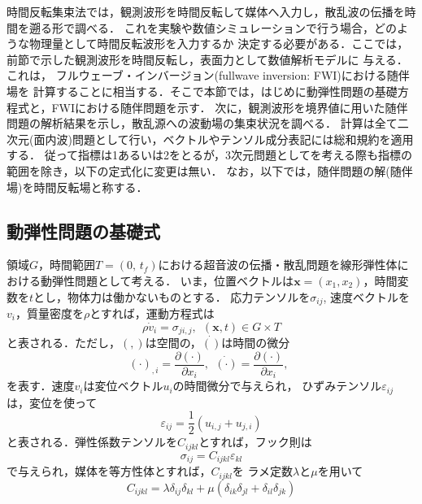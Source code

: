 時間反転集束法では，観測波形を時間反転して媒体へ入力し，散乱波の伝播を時間を遡る形で調べる．
これを実験や数値シミュレーションで行う場合，どのような物理量として時間反転波形を入力するか
決定する必要がある．ここでは，前節で示した観測波形を時間反転し，表面力として数値解析モデルに
与える．これは， フルウェーブ・インバージョン(fullwave inversion: FWI)における随伴場を
計算することに相当する．そこで本節では，はじめに動弾性問題の基礎方程式と，FWIにおける随伴問題を示す．
次に，観測波形を境界値に用いた随伴問題の解析結果を示し，散乱源への波動場の集束状況を調べる．
計算は全て二次元(面内波)問題として行い，ベクトルやテンソル成分表記には総和規約を適用する．
従って指標は1あるいは2をとるが，3次元問題としてを考える際も指標の範囲を除き，以下の定式化に変更は無い．
なお，以下では，随伴問題の解(随伴場)を時間反転場と称する．
\subsection{動弾性問題の基礎式}
領域$G$，時間範囲$T=(0,\, t_f)$における超音波の伝播・散乱問題を線形弾性体における動弾性問題として考える．
いま，位置ベクトルは$\boldsymbol{x}=(x_1,x_2)$，時間変数を$t$とし，物体力は働かないものとする．
応力テンソルを$\sigma_{ij}$, 速度ベクトルを$v_i$，質量密度を$\rho$とすれば，運動方程式は
\begin{equation}
	\rho \dot{v}_i=\sigma_{ji,j}, \ \ (\boldsymbol{x},t)\in G\times T
	\label{eqn:}
\end{equation}
と表される．ただし，$(,)$は空間の，$\dot{()}$は時間の微分
\begin{equation}
	(\cdot)_{,i}=\frac{\partial (\cdot)}{\partial x_i}, \ \ 
	\dot{(\cdot)}=\frac{\partial (\cdot)}{\partial x_i}, \ \ 
	\label{eqn:}
\end{equation}
を表す．速度$v_i$は変位ベクトル$u_i$の時間微分で与えられ，
ひずみテンソル$\varepsilon_{ij}$は，変位を使って
\begin{equation}
	\varepsilon_{ij}=\frac{1}{2}(u_{i,j}+u_{j,i})
	\label{eqn:FWD}
\end{equation}
と表される．弾性係数テンソルを$C_{ijkl}$とすれば，フック則は
\begin{equation}
	\sigma_{ij}=C_{ijkl}\varepsilon_{kl}
	\label{eqn:}
\end{equation}
で与えられ，媒体を等方性体とすれば，$C_{ijkl}$を
ラメ定数$\lambda$と$\mu$を用いて
\begin{equation}
	C_{ijkl}=\lambda \delta_{ij}\delta_{kl} +
	\mu (
	\delta_{ik}\delta_{jl}
	+
	\delta_{il}\delta_{jk} 
	)
	\label{eqn:Cijkl_iso}
\end{equation}
